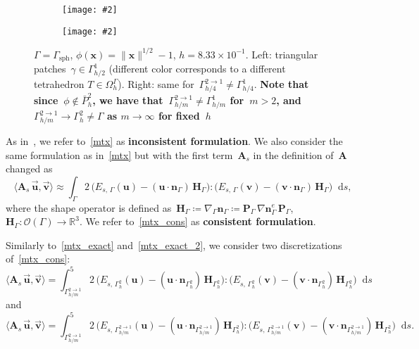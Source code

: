 \documentclass[12pt]{article}
\newcommand{\includegraphicsw}[2][1.]{\texttt{[image: \#2]}}
\newcommand{\vect}[1]{\boldsymbol{\mathbf{#1}}}
\newcommand*\diff{\mathop{}\!\mathrm{d}}
\newcommand{\sphere}{{\Gamma_{\text{sph}}}}
\begin{document}
\begin{figure}[H]
	\centering
	\begin{subfigure}{.5\linewidth}
		\centering
		\includegraphicsw[.45]{patches_2_inexact.png}
	\end{subfigure}%
	\begin{subfigure}{.5\linewidth}
		\centering
		\includegraphicsw[.45]{patches_4_inexact.png}
	\end{subfigure}%
	\par\bigskip
	\caption{$\Gamma = \sphere$, $\phi(\vect x) = \|\vect x\|^{1/2} - 1$, $h = 8.33\times10^{-1}$. Left: triangular patches~$\gamma \in \Gamma_{h/2}^1$ (different color corresponds to a different tetrahedron $T \in \Omega^\Gamma_h$). Right: same for~$\Gamma_{h/4}^{2 \rightarrow 1} \ne \Gamma_{h/4}^1$. \textbf{Note that since~$\phi \not\in \bar{P}^2_h$, we have that~$\Gamma_{h/m}^{2 \rightarrow 1} \ne \Gamma_{h/m}^1$ for~$m > 2$, and $\Gamma_{h/m}^{2 \rightarrow 1} \rightarrow \Gamma_h^2 \ne \Gamma$ as $m \rightarrow \infty$ for fixed~$h$}}
	\label{fig:phi_inexact}		
\end{figure}

As in~\cite{veclaplace}, we refer to~\eqref{mtx} as \textbf{inconsistent formulation}. We also consider the same formulation as in~\eqref{mtx} but with the first term~$\vect A_s$ in the definition of~$\vect A$ changed as
\begin{equation}\label{mtx_cons}
	\langle \vect A_s\,\vec{\vect u}, \vec{\vect v} \rangle \approx \int_{\Gamma} 2\,\big( E_{s,\,\Gamma}(\vect u) - (\vect u\cdot\vect n_{\Gamma})\,\vect H_{\Gamma} \big) : \big( E_{s,\,\Gamma}(\vect v) - (\vect v\cdot\vect n_\Gamma)\,\vect H_{\Gamma} \big) \diff{s},
\end{equation}
where the shape operator is defined as~$\vect H_\Gamma \coloneqq \nabla_\Gamma \vect n_\Gamma \coloneqq \vect P_{\Gamma}\,\nabla \vect n^e_\Gamma\,\vect P_{\Gamma}$, $\vect H_\Gamma : \mathcal{O}(\Gamma) \rightarrow \mathbb{R}^3$. We refer to~\eqref{mtx_cons} as \textbf{consistent formulation}.

Similarly to~\eqref{mtx_exact} and~\eqref{mtx_exact_2}, we consider two discretizations of~\eqref{mtx_cons}:
\begin{equation}\label{mtx_cons_exact}
	\langle \vect A_s\,\vec{\vect u}, \vec{\vect v} \rangle = \int^5_{\Gamma_{h/m}^{2 \to 1}} 2\,\big( E_{s,\,\Gamma_{h}^{2}}(\vect u) - (\vect u\cdot\vect n_{\Gamma_h^2})\,\vect H_{\Gamma_h^2} \big) : \big( E_{s,\,\Gamma_{h}^{2}}(\vect v) - (\vect v\cdot\vect n_{\Gamma_h^2})\,\vect H_{\Gamma_h^2} \big) \diff{s} 
\end{equation}
and
\begin{equation}\label{mtx_cons_exact_2}
	\langle \vect A_s\,\vec{\vect u}, \vec{\vect v} \rangle = \int^5_{\Gamma_{h/m}^{2 \to 1}} 2\,\big( E_{s,\,\Gamma_{h/m}^{2 \to 1}}(\vect u) - (\vect u\cdot\vect n_{\Gamma_{h/m}^{2 \to 1}})\,\vect H_{\Gamma_h^2} \big) : \big( E_{s,\,\Gamma_{h/m}^{2 \to 1}}(\vect v) - (\vect v\cdot\vect n_{\Gamma_{h/m}^{2 \to 1}})\,\vect H_{\Gamma_h^2} \big) \diff{s}.
\end{equation}
\end{document}
